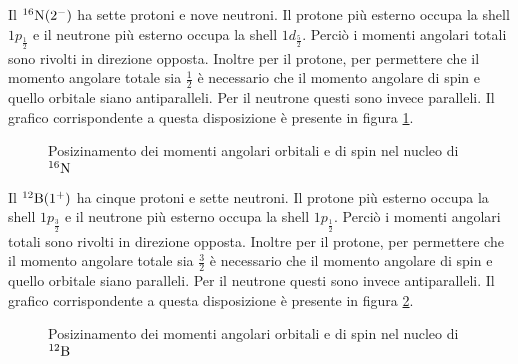 \documentclass[../main.tex]{subfiles}
\begin{document}
	\begin{svol}
		Il $ ^{16}\mathrm{N}(2^{-}) $ ha sette protoni e nove neutroni. Il protone più esterno occupa la shell $ 1p_{\frac{1}{2}} $ e il neutrone più esterno occupa la shell $ 1d_{\frac{5}{2}} $. Perciò i momenti angolari totali sono rivolti in direzione opposta. Inoltre per il protone, per permettere che il momento angolare totale sia $ \frac{1}{2} $ è necessario che il momento angolare di spin e quello orbitale siano antiparalleli. Per il neutrone questi sono invece paralleli. Il grafico corrispondente a questa disposizione è presente in figura \ref{fig:16N}.
		\begin{figure}[h]
			\centering
			\caption{Posizinamento dei momenti angolari orbitali e di spin nel nucleo di $ ^{16}\mathrm{N} $}\label{fig:16N}
		\end{figure}

	
		
		Il $ ^{12}\mathrm{B}(1^{+}) $ ha cinque protoni e sette neutroni. Il protone più esterno occupa la shell $ 1p_{\frac{3}{2}} $ e il neutrone più esterno occupa la shell $ 1p_{\frac{1}{2}} $. Perciò i momenti angolari totali sono rivolti in direzione opposta. Inoltre per il protone, per permettere che il momento angolare totale sia $ \frac{3}{2} $ è necessario che il momento angolare di spin e quello orbitale siano paralleli. Per il neutrone questi sono invece antiparalleli. Il grafico corrispondente a questa disposizione è presente in figura \ref{fig:12B}.
		\begin{figure}[h]
			\centering
			\caption{Posizinamento dei momenti angolari orbitali e di spin nel nucleo di $ ^{12}\mathrm{B} $}\label{fig:12B}
		\end{figure}


\end{svol}
\end{document}

